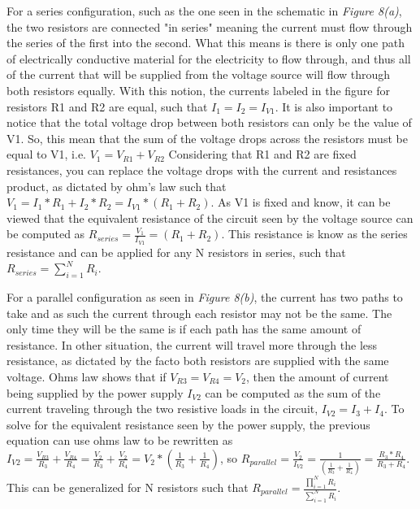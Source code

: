 \documentclass[12pt]{article}
\begin{document}
For a series configuration, such as the one seen in the schematic in \textit{Figure 8(a)}, the two resistors are connected "in series" meaning the current must flow through the series of the first into the second. What this means is there is only one path of electrically conductive material for the electricity to flow through, and thus all of the current that will be supplied from the voltage source will flow through both resistors equally. With this notion, the currents labeled in the figure for resistors R1 and R2 are equal, such that $I_{1} = I_{2} = I_{V1}$. It is also important to notice that the total voltage drop between both resistors can only be the value of V1. So, this mean that the sum of the voltage drops across the resistors must be equal to V1, i.e. $V_{1} = V_{R1} + V_{R2}$ Considering that R1 and R2 are fixed resistances, you can replace the voltage drops with the current and resistances product, as dictated by ohm's law such that $V_{1} = I_{1}*R_{1} + I_{2}*R_{2} = I_{V1}*(R_{1} + R_{2})$. As V1 is fixed and know,  it can be viewed that the equivalent resistance of the circuit seen by the voltage source can be computed as $R_{series} = \frac{V_{1}}{I_{V1}} = (R_{1} + R_{2})$. This resistance is know as the series resistance and can be applied for any N resistors in series, such that $R_{series} = \sum^{N}_{i=1} R_{i}$.

For a parallel configuration as seen in \textit{Figure 8(b)}, the current has two paths to take and as such the current through each resistor may not be the same. The only time they will be the same is if each path has the same amount of resistance. In other situation, the current will travel more through the less resistance, as dictated by the facto both resistors are supplied with the same voltage. Ohms law shows that if $V_{R3} = V_{R4} = V_{2}$, then the amount of current being supplied by the power supply $I_{V2}$ can be computed as the sum of the current traveling through the two resistive loads in the circuit, $I_{V2} = I_{3} + I_{4}$. To solve for the equivalent resistance seen by the power supply, the previous equation can use ohms law to be rewritten as $I_{V2} = \frac{V_{R3}}{R_{3}} + \frac{V_{R4}}{R_{4}} = \frac{V_{2}}{R_{3}} + \frac{V_{2}}{R_{4}} = V_{2} * (\frac{1}{R_{3}}+\frac{1}{R_{4}})$, so $R_{parallel} = \frac{V_{2}}{I_{V2}} = \frac{1}{(\frac{1}{R_{3}}+\frac{1}{R_{4}})} = \frac{R_{3}*R_{4}}{R_{3}+R_{4}} $. This can be generalized for N resistors
such that $R_{parallel} = \frac{\prod^{N}_{i=1} R_{i}}{\sum^{N}_{i=1} R_{i}}$.
\end{document}
